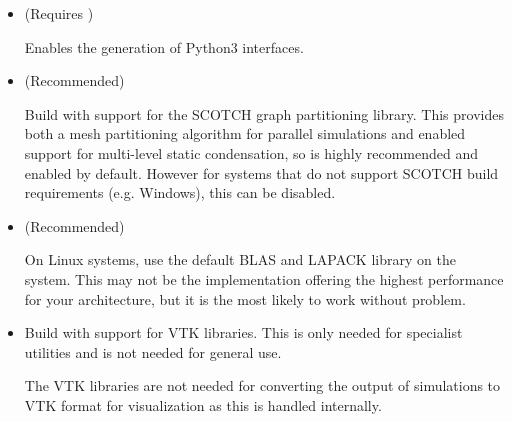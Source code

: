 \begin{itemize}
    \item {} (Requires )

    Enables the generation of Python3 interfaces.

    \item {} (Recommended)

    Build \nekpp with support for the SCOTCH graph partitioning library. This
    provides both a mesh partitioning algorithm for parallel simulations and
    enabled support for multi-level static condensation, so is highly
    recommended and enabled by default. However for systems that do not support
    SCOTCH build requirements (e.g. Windows), this can be disabled.

    \item {} (Recommended)

    On Linux systems, use the default BLAS and LAPACK library on the system.
    This may not be the implementation offering the highest performance for your
    architecture, but it is the most likely to work without problem.

    \item {}

    Build \nekpp with support for VTK libraries. This is only needed for
    specialist utilities and is not needed for general use.

    \begin{notebox}
    The VTK libraries are not needed for converting the output of simulations to
    VTK format for visualization as this is handled internally.
    \end{notebox}
\end{itemize}

